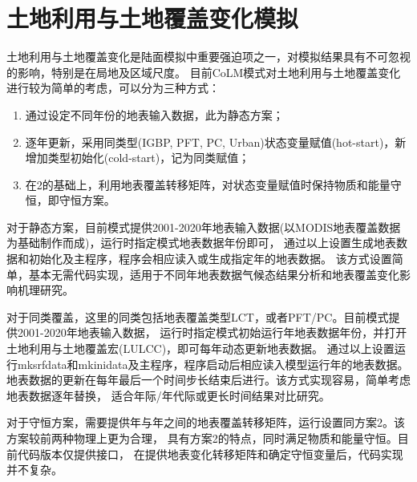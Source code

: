 \chapter{土地利用与土地覆盖变化模拟}\label{土地利用与土地覆盖变化模拟}

土地利用与土地覆盖变化是陆面模拟中重要强迫项之一，对模拟结果具有不可忽视的影响，特别是在局地及区域尺度。
目前CoLM模式对土地利用与土地覆盖变化进行较为简单的考虑，可以分为三种方式：
\begin{enumerate}
    \item 通过设定不同年份的地表输入数据，此为静态方案；
    \item 逐年更新，采用同类型(IGBP, PFT, PC, Urban)状态变量赋值(hot-start)，新增加类型初始化(cold-start)，记为同类赋值；
    \item 在2的基础上，利用地表覆盖转移矩阵，对状态变量赋值时保持物质和能量守恒，即守恒方案。
\end{enumerate}

对于静态方案，目前模式提供2001-2020年地表输入数据(以MODIS地表覆盖数据为基础制作而成)，运行时指定模式地表数据年份即可，
通过以上设置生成地表数据和初始化及主程序，程序会相应读入或生成指定年的地表数据。
该方式设置简单，基本无需代码实现，适用于不同年地表数据气候态结果分析和地表覆盖变化影响机理研究。

对于同类覆盖，这里的同类包括地表覆盖类型LCT，或者PFT/PC。目前模式提供2001-2020年地表输入数据，
运行时指定模式初始运行年地表数据年份，并打开土地利用与土地覆盖宏(LULCC)，即可每年动态更新地表数据。
通过以上设置运行mksrfdata和mkinidata及主程序，程序启动后相应读入模型运行年的地表数据。
地表数据的更新在每年最后一个时间步长结束后进行。该方式实现容易，简单考虑地表数据逐年替换，
适合年际/年代际或更长时间结果对比研究。

对于守恒方案，需要提供年与年之间的地表覆盖转移矩阵，运行设置同方案2。该方案较前两种物理上更为合理，
具有方案2的特点，同时满足物质和能量守恒。目前代码版本仅提供接口，
在提供地表变化转移矩阵和确定守恒变量后，代码实现并不复杂。
